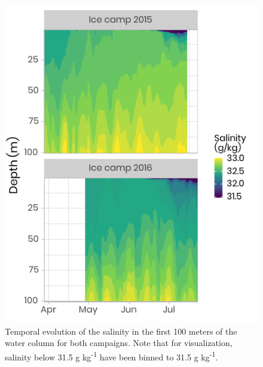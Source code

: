 \documentclass[12pt,a4paper]{scrartcl}
\begin{document}
\begin{figure}[h]
	\centering
	\includegraphics[scale = 1]{../../../graphs/fig03.pdf}
	\caption{Temporal evolution of the salinity in the first 100 meters of the water column for both campaigns. Note that for visualization, salinity below 31.5 g kg\textsuperscript{-1} have been binned to 31.5 g kg\textsuperscript{-1}.}
\end{figure}

\clearpage
\newpage
\end{document}

